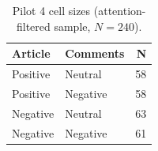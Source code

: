 \begin{table}[!h]
\centering
\caption{\label{tab:p4cells}Pilot 4 cell sizes (attention-filtered sample, $N = 240$).}
\centering
\fontsize{10}{12}\selectfont
\begin{tabular}[t]{llr}
\toprule
Article & Comments & N\\
\midrule
Positive & Neutral & 58\\
Positive & Negative & 58\\
Negative & Neutral & 63\\
Negative & Negative & 61\\
\bottomrule
\end{tabular}
\end{table}
